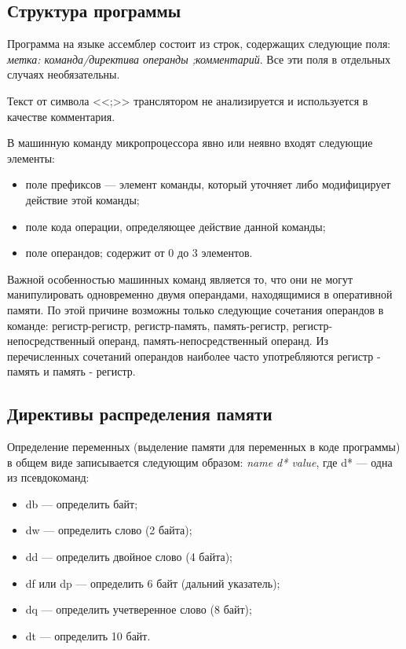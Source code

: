 \subsection{Структура программы}

Программа на языке ассемблер состоит из строк, содержащих следующие поля:
\textit{метка: команда/директива операнды ;комментарий}.
Все эти поля в отдельных случаях необязательны. 

Текст от символа <<;>> транслятором не анализируется и используется
в качестве комментария.

В машинную команду микропроцессора явно или неявно входят следующие элементы:

\begin{itemize}
\item поле префиксов --- элемент команды, который уточняет либо модифицирует действие этой
  команды;
\item поле кода операции, определяющее действие данной команды;
\item поле операндов; содержит от 0 до 3 элементов.
\end{itemize}

Важной особенностью машинных команд является то, что они не могут манипулировать
одновременно двумя операндами, находящимися в оперативной памяти. По этой причине
возможны только следующие сочетания операндов в команде:
регистр-регистр,
регистр-память,
память-регистр,
регистр-непосредственный операнд,
память-непосредственный операнд.
Из перечисленных сочетаний операндов наиболее часто употребляются регистр - память и
память - регистр.


\subsection{Директивы распределения памяти}

Определение переменных (выделение памяти для переменных в коде программы) в общем
виде записывается следующим образом: \textit{name d* value},
где d* --- одна из псевдокоманд:
\begin{itemize}
\item db --- определить байт;
\item dw --- определить слово (2 байта);
\item dd --- определить двойное слово (4 байта);
\item df или dp --- определить 6 байт (дальний указатель);
\item dq --- определить учетверенное слово (8 байт);
\item dt --- определить 10 байт.
\end{itemize}

